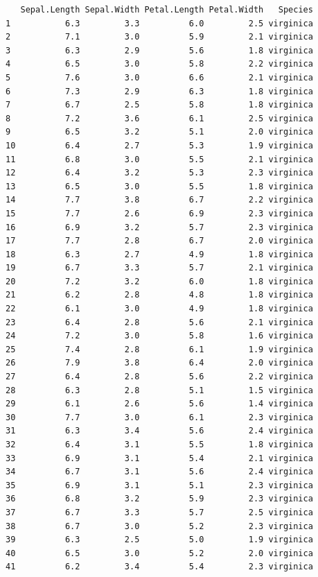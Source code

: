 \documentclass[
  a4paper,
]{ltjsbook}
\begin{document}
\begin{verbatim}
   Sepal.Length Sepal.Width Petal.Length Petal.Width   Species
1           6.3         3.3          6.0         2.5 virginica
2           7.1         3.0          5.9         2.1 virginica
3           6.3         2.9          5.6         1.8 virginica
4           6.5         3.0          5.8         2.2 virginica
5           7.6         3.0          6.6         2.1 virginica
6           7.3         2.9          6.3         1.8 virginica
7           6.7         2.5          5.8         1.8 virginica
8           7.2         3.6          6.1         2.5 virginica
9           6.5         3.2          5.1         2.0 virginica
10          6.4         2.7          5.3         1.9 virginica
11          6.8         3.0          5.5         2.1 virginica
12          6.4         3.2          5.3         2.3 virginica
13          6.5         3.0          5.5         1.8 virginica
14          7.7         3.8          6.7         2.2 virginica
15          7.7         2.6          6.9         2.3 virginica
16          6.9         3.2          5.7         2.3 virginica
17          7.7         2.8          6.7         2.0 virginica
18          6.3         2.7          4.9         1.8 virginica
19          6.7         3.3          5.7         2.1 virginica
20          7.2         3.2          6.0         1.8 virginica
21          6.2         2.8          4.8         1.8 virginica
22          6.1         3.0          4.9         1.8 virginica
23          6.4         2.8          5.6         2.1 virginica
24          7.2         3.0          5.8         1.6 virginica
25          7.4         2.8          6.1         1.9 virginica
26          7.9         3.8          6.4         2.0 virginica
27          6.4         2.8          5.6         2.2 virginica
28          6.3         2.8          5.1         1.5 virginica
29          6.1         2.6          5.6         1.4 virginica
30          7.7         3.0          6.1         2.3 virginica
31          6.3         3.4          5.6         2.4 virginica
32          6.4         3.1          5.5         1.8 virginica
33          6.9         3.1          5.4         2.1 virginica
34          6.7         3.1          5.6         2.4 virginica
35          6.9         3.1          5.1         2.3 virginica
36          6.8         3.2          5.9         2.3 virginica
37          6.7         3.3          5.7         2.5 virginica
38          6.7         3.0          5.2         2.3 virginica
39          6.3         2.5          5.0         1.9 virginica
40          6.5         3.0          5.2         2.0 virginica
41          6.2         3.4          5.4         2.3 virginica
\end{verbatim}
\end{document}
